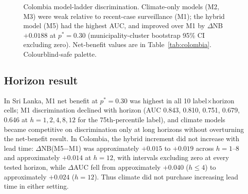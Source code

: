 \documentclass[11pt,a4paper]{article}
\begin{document}
\begin{figure}[htbp]
\centering
{}
\caption{Colombia model-ladder discrimination. Climate-only models (M2, M3) were weak relative to recent-case surveillance (M1); the hybrid model (M5) had the highest AUC, and improved over M1 by $\Delta$NB $+0.0188$ at $p^*=0.30$ (municipality-cluster bootstrap 95\% CI excluding zero). Net-benefit values are in Table~\ref{tab:colombia}. Colourblind-safe palette.}
\label{fig:colombia}
\end{figure}

\subsection{Horizon result}
In Sri Lanka, M1 net benefit at $p^*=0.30$ was highest in all 10 label$\times$horizon cells; M1 discrimination declined with horizon (AUC 0.843, 0.810, 0.751, 0.679, 0.646 at $h=1,2,4,8,12$ for the 75th-percentile label), and climate models became competitive on discrimination only at long horizons without overturning the net-benefit result. In Colombia, the hybrid increment did not increase with lead time: $\Delta$NB(M5$-$M1) was approximately $+0.015$ to $+0.019$ across $h=1$--8 and approximately $+0.014$ at $h=12$, with intervals excluding zero at every tested horizon, while $\Delta$AUC fell from approximately $+0.040$ ($h\le4$) to approximately $+0.024$ ($h=12$). Thus climate did not purchase increasing lead time in either setting.
\end{document}

